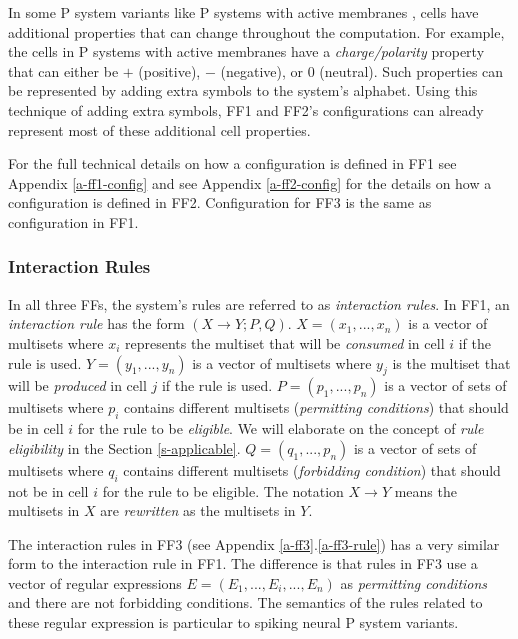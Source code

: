 \documentclass{article}
\newcommand{\ra}{\rightarrow}
\begin{document}
In some P system variants like P systems with active membranes \cite{active-mem}, cells have 
additional properties that can change throughout the computation. For example, the cells in P 
systems with active membranes have a \emph{charge/polarity} property that can either be $+$ 
(positive), $-$ (negative), or $0$ (neutral). Such properties can be represented by adding extra
symbols to the system's alphabet. Using this technique of adding extra symbols, FF1 and FF2's 
configurations can already represent most of these additional cell properties.

For the full technical details on how a configuration is defined in FF1 see Appendix 
\ref{a-ff1-config} and see Appendix \ref{a-ff2-config} for the details on how a configuration is 
defined in FF2. Configuration for FF3 is the same as configuration in FF1.


\subsubsection{Interaction Rules}

In all three FFs, the system's rules are referred to as \emph{interaction rules}. In FF1, an 
\emph{interaction rule} has the form $(X \ra Y; P,Q)$. $X = (x_1,...,x_n)$ is a vector of multisets
where $x_i$ represents the multiset that will be \emph{consumed} in cell $i$ if the rule is used.
$Y = (y_1,...,y_n)$ is a vector of multisets where $y_j$ is the multiset that will be 
\emph{produced} in cell $j$ if the rule is used. $P = (p_1,...,p_n)$ is a vector of sets of 
multisets where $p_i$ contains different multisets (\emph{permitting conditions}) that should be in 
cell $i$ for the rule to be \emph{eligible}. We will elaborate on the concept of \emph{rule 
eligibility} in the Section \ref{s-applicable}. $Q = (q_1,...,p_n)$ is a vector of sets of multisets
where $q_i$ contains different multisets  (\emph{forbidding condition}) that should not be in cell 
$i$ for the rule to be eligible. The notation $X\ra Y$ means the multisets in $X$ are 
\emph{rewritten} as the multisets in $Y$.

The interaction rules in FF3 (see Appendix \ref{a-ff3}.\ref{a-ff3-rule}) has a very similar form
to the interaction rule in FF1. The difference is that rules in FF3 use a vector of regular 
expressions $E = (E_1,...,E_i,...,E_n)$ as \emph{permitting conditions} and there are not forbidding
conditions. The semantics of the rules related to these regular expression is particular to spiking
neural P system variants.
\end{document}
